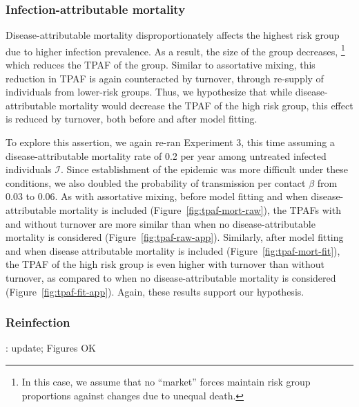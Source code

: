 \subsubsection{Infection-attributable mortality}\label{aaa:what-if-mort}
Disease-attributable mortality disproportionately affects the highest risk group
due to higher infection prevalence.
As a result, the size of the group decreases,%
\footnote{In this case, we assume that no ``market'' forces maintain risk group proportions
  against changes due to unequal death.}
which reduces the TPAF of the group.
Similar to assortative mixing, this reduction in TPAF is again counteracted by turnover,
through re-supply of individuals from lower-risk groups.
Thus, we hypothesize that
while disease-attributable mortality would
decrease the TPAF of the high risk group,
this effect is reduced by turnover,
both before and after model fitting. 
\par
To explore this assertion, we again re-ran Experiment 3,
this time assuming a disease-attributable mortality rate of 0.2 per year
among untreated infected individuals $\mathcal{I}$.
Since establishment of the epidemic was more difficult under these conditions,
we also doubled the probability of transmission per contact $\beta$
from 0.03 to 0.06.
As with assortative mixing,
before model fitting and when disease-attributable mortality is included
(Figure~\ref{fig:tpaf-mort-raw}),
the TPAFs with and without turnover are more similar
than when no disease-attributable mortality is considered
(Figure~\ref{fig:tpaf-raw-app}).
Similarly, after model fitting and when disease attributable mortality is included
(Figure~\ref{fig:tpaf-mort-fit}),
the TPAF of the high risk group is even higher with turnover than without turnover,
as compared to when no disease-attributable mortality is considered
(Figure~\ref{fig:tpaf-fit-app}).
Again, these results support our hypothesis.
\subsubsection{Reinfection}\label{aaa:what-if-sirs}
: update; Figures OK